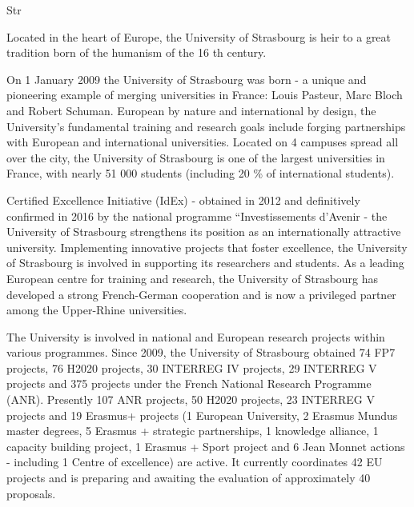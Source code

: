 \begin{sitedescription}{Str}


  
Located in the heart of Europe, the University of Strasbourg is heir to a great tradition born of
the humanism of the 16 th century.

On 1 January 2009 the University of Strasbourg was born - a unique and pioneering
example of merging universities in France: Louis Pasteur, Marc Bloch and Robert Schuman.
European by nature and international by design, the University’s fundamental training and
research goals include forging partnerships with European and international universities.
Located on 4 campuses spread all over the city, the University of Strasbourg is one of the
largest universities in France, with nearly 51 000 students (including 20 \% of international
students).

Certified Excellence Initiative (IdEx) - obtained in 2012 and definitively confirmed in 2016
by the national programme “Investissements d’Avenir - the University of Strasbourg
strengthens its position as an internationally attractive university. Implementing innovative
projects that foster excellence, the University of Strasbourg is involved in supporting its
researchers and students.
As a leading European centre for training and research, the University of Strasbourg has
developed a strong French-German cooperation and is now a privileged partner among the
Upper-Rhine universities.

The University is involved in national and European research projects within various
programmes. Since 2009, the University of Strasbourg obtained 74 FP7 projects, 76 H2020
projects, 30 INTERREG IV projects, 29 INTERREG V projects and 375 projects under the
French National Research Programme (ANR). Presently 107 ANR projects, 50 H2020
projects, 23 INTERREG V projects and 19 Erasmus+ projects (1 European University, 2
Erasmus Mundus master degrees, 5 Erasmus + strategic partnerships, 1 knowledge alliance, 1
capacity building project, 1 Erasmus + Sport project and 6 Jean Monnet actions - including 1
Centre of excellence) are active. It currently coordinates 42 EU projects and is preparing and
awaiting the evaluation of approximately 40 proposals.


\end{sitedescription}
